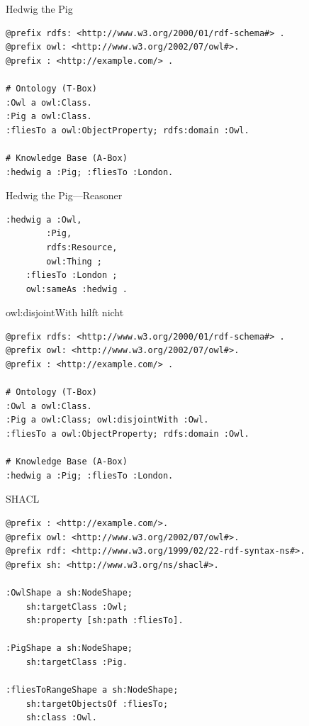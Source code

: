 \documentclass[14pt,aspectratio=1610]{beamer}
\begin{document}
\begin{frame}[fragile]{Hedwig the Pig}
\small
\begin{lstlisting}
@prefix rdfs: <http://www.w3.org/2000/01/rdf-schema#> .
@prefix owl: <http://www.w3.org/2002/07/owl#>.
@prefix : <http://example.com/> .

# Ontology (T-Box)
:Owl a owl:Class.
:Pig a owl:Class.
:fliesTo a owl:ObjectProperty; rdfs:domain :Owl.

# Knowledge Base (A-Box)
:hedwig a :Pig; :fliesTo :London.
\end{lstlisting}
\end{frame}

\begin{frame}[fragile]{Hedwig the Pig---Reasoner}
\begin{lstlisting}
:hedwig a :Owl,
        :Pig,
        rdfs:Resource,
        owl:Thing ;
    :fliesTo :London ;
    owl:sameAs :hedwig .
\end{lstlisting}
\end{frame}

\begin{frame}[fragile]{owl:disjointWith hilft nicht}
\small
\begin{lstlisting}
@prefix rdfs: <http://www.w3.org/2000/01/rdf-schema#> .
@prefix owl: <http://www.w3.org/2002/07/owl#>.
@prefix : <http://example.com/> .

# Ontology (T-Box)
:Owl a owl:Class.
:Pig a owl:Class; owl:disjointWith :Owl.
:fliesTo a owl:ObjectProperty; rdfs:domain :Owl.

# Knowledge Base (A-Box)
:hedwig a :Pig; :fliesTo :London.
\end{lstlisting}
\end{frame}

\begin{frame}[fragile]{SHACL}
\small
\begin{lstlisting}
@prefix : <http://example.com/>.
@prefix owl: <http://www.w3.org/2002/07/owl#>.
@prefix rdf: <http://www.w3.org/1999/02/22-rdf-syntax-ns#>.
@prefix sh: <http://www.w3.org/ns/shacl#>.

:OwlShape a sh:NodeShape;
    sh:targetClass :Owl;    
    sh:property [sh:path :fliesTo].

:PigShape a sh:NodeShape;
    sh:targetClass :Pig.

:fliesToRangeShape a sh:NodeShape;                  
    sh:targetObjectsOf :fliesTo;        
    sh:class :Owl.
\end{lstlisting}
\end{frame}
\end{document}

